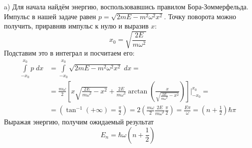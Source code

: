 a) Для начала найдём энергию, воспользовавшись правилом Бора-Зоммерфельда. Импульс в нашей задаче равен $p = \sqrt{2mE - m^2\omega^2x^2}$. Точку поворота можно получить, приравняв импульс к нулю и выразив $x$:
\[
x_0 = \sqrt{\frac{2E}{m\omega^2}}
\]
Подставим это в интеграл и посчитаем его:
\begin{align*}
\int\limits_{-x_0}^{x_0}p\;dx & = \int\limits_{-x_0}^{x_0}\sqrt{2mE - m^2\omega^2x^2}\;dx =\\& = \frac{m\omega}{2}\left[x\sqrt{\frac{2E}{m\omega^2}- x^2} + \frac{2E}{m\omega^2}\arctan\left( \frac{x}{\sqrt{\frac{2E}{m\omega^2} - x^2}} \right)\right]\Bigg|_{-x_0}^{x_0} = \\ & = \left( \tan^{-1}(+\infty) = \frac{\pi}{2}\right) = 2(\frac{m\omega}{2}\frac{2E}{m\omega^2}\frac{\pi}{2}) = \frac{E\pi}{\omega} = (n + \frac{1}{2})\hbar\pi
\end{align*}
Выражая энергию, получим ожидаемый результат
\[
E_n = \hbar\omega(n + \frac{1}{2})
\]

